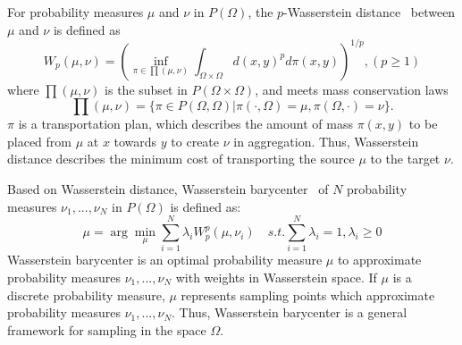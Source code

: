 For probability measures $\mu$ and $\nu$ in $P(\Omega)$,
the $p$-Wasserstein distance~\cite{villani:2008:optimal} between $\mu$ and $\nu$ is defined as
\begin{equation*}
  W_p(\mu,\nu)=\left(\inf\limits_{\pi\in\prod(\mu,\nu)}\int_{\Omega\times\Omega}d(x,y)^pd\pi(x,y)\right )^{1/p}, (p\geq1)
\end{equation*}
where $\prod(\mu,\nu)$ is the subset in $P(\Omega\times\Omega)$, and meets mass conservation laws
\begin{equation*}
\prod(\mu,\nu)=\{\pi\in P(\Omega,\Omega)|\pi(\cdot,\Omega)=\mu,\pi(\Omega,\cdot)=\nu\}.
\end{equation*}
$\pi$ is a transportation plan,
which describes the amount of mass $\pi(x,y)$ to be placed from $\mu$ at $x$ towards $y$ to create $\nu$ in aggregation.
Thus,
Wasserstein distance describes the minimum cost of transporting the source $\mu$ to the target $\nu$.


Based on Wasserstein distance,
Wasserstein barycenter~\cite{agueh:2011:barycenters,cuturi:2013:fast,BTSSPP:2016:Wasserstein} of $N$ probability measures ${\nu_1,...,\nu_N}$ in $P(\Omega)$ is defined as:
\begin{equation}\label{WB}
    \mu=\arg\min\limits_\mu\sum\limits_{i=1}^N\lambda_iW_p^p(\mu,\nu_i)  \quad
    s.t. \sum\limits_{i=1}^N\lambda_i=1, \lambda_i\geq0
\end{equation}
Wasserstein barycenter is an optimal probability measure $\mu$ to approximate probability measures ${\nu_1,...,\nu_N}$ with weights in Wasserstein space.
If $\mu$ is a discrete probability measure,
$\mu$ represents sampling points which approximate probability measures ${\nu_1,...,\nu_N}$.
Thus,
Wasserstein barycenter is a general framework for sampling in the space $\Omega$.